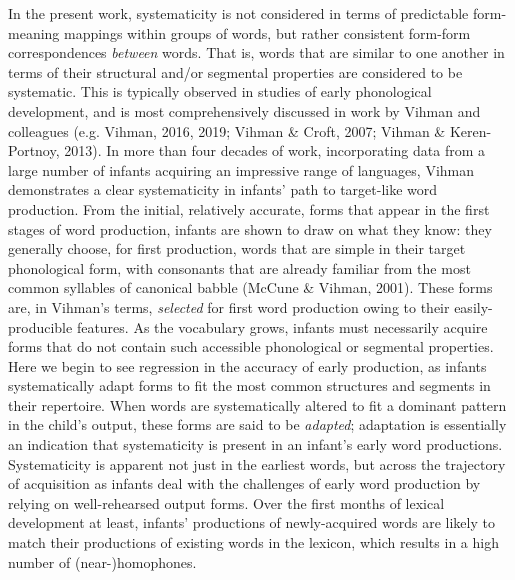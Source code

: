 \documentclass[
  man]{apa6}
\begin{document}
In the present work, systematicity is not considered in terms of predictable form-meaning mappings within groups of words, but rather consistent form-form correspondences \emph{between} words. That is, words that are similar to one another in terms of their structural and/or segmental properties are considered to be systematic. This is typically observed in studies of early phonological development, and is most comprehensively discussed in work by Vihman and colleagues (e.g. Vihman, 2016, 2019; Vihman \& Croft, 2007; Vihman \& Keren-Portnoy, 2013). In more than four decades of work, incorporating data from a large number of infants acquiring an impressive range of languages, Vihman demonstrates a clear systematicity in infants' path to target-like word production. From the initial, relatively accurate, forms that appear in the first stages of word production, infants are shown to draw on what they know: they generally choose, for first production, words that are simple in their target phonological form, with consonants that are already familiar from the most common syllables of canonical babble (McCune \& Vihman, 2001). These forms are, in Vihman's terms, \emph{selected} for first word production owing to their easily-producible features. As the vocabulary grows, infants must necessarily acquire forms that do not contain such accessible phonological or segmental properties. Here we begin to see regression in the accuracy of early production, as infants systematically adapt forms to fit the most common structures and segments in their repertoire. When words are systematically altered to fit a dominant pattern in the child's output, these forms are said to be \emph{adapted}; adaptation is essentially an indication that systematicity is present in an infant's early word productions. Systematicity is apparent not just in the earliest words, but across the trajectory of acquisition as infants deal with the challenges of early word production by relying on well-rehearsed output forms. Over the first months of lexical development at least, infants' productions of newly-acquired words are likely to match their productions of existing words in the lexicon, which results in a high number of (near-)homophones.
\end{document}
